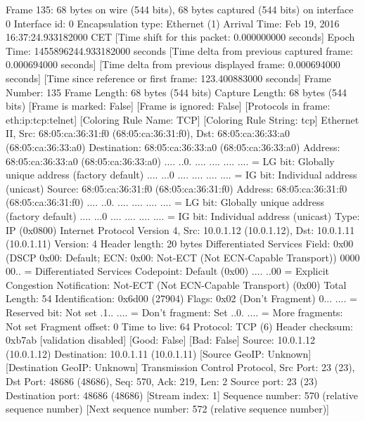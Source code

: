 Frame 135: 68 bytes on wire (544 bits), 68 bytes captured (544 bits) on interface 0
    Interface id: 0
    Encapsulation type: Ethernet (1)
    Arrival Time: Feb 19, 2016 16:37:24.933182000 CET
    [Time shift for this packet: 0.000000000 seconds]
    Epoch Time: 1455896244.933182000 seconds
    [Time delta from previous captured frame: 0.000694000 seconds]
    [Time delta from previous displayed frame: 0.000694000 seconds]
    [Time since reference or first frame: 123.400883000 seconds]
    Frame Number: 135
    Frame Length: 68 bytes (544 bits)
    Capture Length: 68 bytes (544 bits)
    [Frame is marked: False]
    [Frame is ignored: False]
    [Protocols in frame: eth:ip:tcp:telnet]
    [Coloring Rule Name: TCP]
    [Coloring Rule String: tcp]
Ethernet II, Src: 68:05:ca:36:31:f0 (68:05:ca:36:31:f0), Dst: 68:05:ca:36:33:a0 (68:05:ca:36:33:a0)
    Destination: 68:05:ca:36:33:a0 (68:05:ca:36:33:a0)
        Address: 68:05:ca:36:33:a0 (68:05:ca:36:33:a0)
        .... ..0. .... .... .... .... = LG bit: Globally unique address (factory default)
        .... ...0 .... .... .... .... = IG bit: Individual address (unicast)
    Source: 68:05:ca:36:31:f0 (68:05:ca:36:31:f0)
        Address: 68:05:ca:36:31:f0 (68:05:ca:36:31:f0)
        .... ..0. .... .... .... .... = LG bit: Globally unique address (factory default)
        .... ...0 .... .... .... .... = IG bit: Individual address (unicast)
    Type: IP (0x0800)
Internet Protocol Version 4, Src: 10.0.1.12 (10.0.1.12), Dst: 10.0.1.11 (10.0.1.11)
    Version: 4
    Header length: 20 bytes
    Differentiated Services Field: 0x00 (DSCP 0x00: Default; ECN: 0x00: Not-ECT (Not ECN-Capable Transport))
        0000 00.. = Differentiated Services Codepoint: Default (0x00)
        .... ..00 = Explicit Congestion Notification: Not-ECT (Not ECN-Capable Transport) (0x00)
    Total Length: 54
    Identification: 0x6d00 (27904)
    Flags: 0x02 (Don't Fragment)
        0... .... = Reserved bit: Not set
        .1.. .... = Don't fragment: Set
        ..0. .... = More fragments: Not set
    Fragment offset: 0
    Time to live: 64
    Protocol: TCP (6)
    Header checksum: 0xb7ab [validation disabled]
        [Good: False]
        [Bad: False]
    Source: 10.0.1.12 (10.0.1.12)
    Destination: 10.0.1.11 (10.0.1.11)
    [Source GeoIP: Unknown]
    [Destination GeoIP: Unknown]
Transmission Control Protocol, Src Port: 23 (23), Dst Port: 48686 (48686), Seq: 570, Ack: 219, Len: 2
    Source port: 23 (23)
    Destination port: 48686 (48686)
    [Stream index: 1]
    Sequence number: 570    (relative sequence number)
    [Next sequence number: 572    (relative sequence number)]
